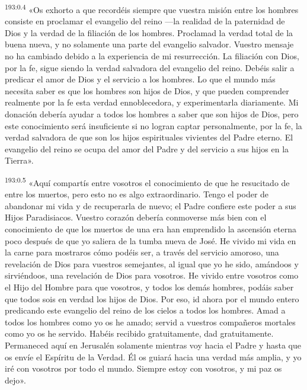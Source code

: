 \par 
\textsuperscript{193:0.4} «Os exhorto a que recordéis siempre que vuestra misión entre los hombres consiste en proclamar el evangelio del reino ---la realidad de la paternidad de Dios y la verdad de la filiación de los hombres. Proclamad la verdad total de la buena nueva, y no solamente una parte del evangelio salvador. Vuestro mensaje no ha cambiado debido a la experiencia de mi resurrección. La filiación con Dios, por la fe, sigue siendo la verdad salvadora del evangelio del reino. Debéis salir a predicar el amor de Dios y el servicio a los hombres. Lo que el mundo más necesita saber es que los hombres son hijos de Dios, y que pueden comprender realmente por la fe esta verdad ennoblecedora, y experimentarla diariamente. Mi donación debería ayudar a todos los hombres a saber que son hijos de Dios, pero este conocimiento será insuficiente si no logran captar personalmente, por la fe, la verdad salvadora de que son los hijos espirituales vivientes del Padre eterno. El evangelio del reino se ocupa del amor del Padre y del servicio a sus hijos en la Tierra».

\par 
\textsuperscript{193:0.5} «Aquí compartís entre vosotros el conocimiento de que he resucitado de entre los muertos, pero esto no es algo extraordinario. Tengo el poder de abandonar mi vida y de recuperarla de nuevo; el Padre confiere este poder a sus Hijos Paradisiacos. Vuestro corazón debería conmoverse más bien con el conocimiento de que los muertos de una era han emprendido la ascensión eterna poco después de que yo saliera de la tumba nueva de José. He vivido mi vida en la carne para mostraros cómo podéis ser, a través del servicio amoroso, una revelación de Dios para vuestros semejantes, al igual que yo he sido, amándoos y sirviéndoos, una revelación de Dios para vosotros. He vivido entre vosotros como el Hijo del Hombre para que vosotros, y todos los demás hombres, podáis saber que todos sois en verdad los hijos de Dios. Por eso, id ahora por el mundo entero predicando este evangelio del reino de los cielos a todos los hombres. Amad a todos los hombres como yo os he amado; servid a vuestros compañeros mortales como yo os he servido. Habéis recibido gratuitamente, dad gratuitamente. Permaneced aquí en Jerusalén solamente mientras voy hacia el Padre y hasta que os envíe el Espíritu de la Verdad. Él os guiará hacia una verdad más amplia, y yo iré con vosotros por todo el mundo. Siempre estoy con vosotros, y mi paz os dejo».

